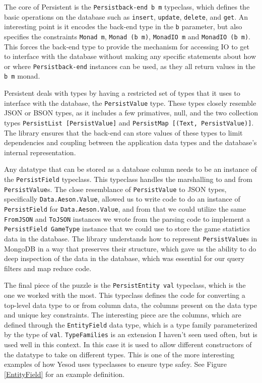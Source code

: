 \documentclass{chi2009}
\newcommand{\code}[1]{\texttt{#1}}
\begin{document}
The core of Persistent is the \code{Persistback-end b m} typeclass, which defines the basic operations on the database such as \code{insert}, \code{update}, \code{delete}, and \code{get}.  An interesting point is it encodes the back-end type in the \code{b} parameter, but also specifies the constraints \code{Monad m}, \code{Monad (b m)}, \code{MonadIO m} and \code{MonadIO (b m)}.  This forces the back-end type to provide the mechanism for accessing IO to get to interface with the database without making any specific statements about how or where \code{Persistback-end} instances can be used, as they all return values in the \code{b m} monad.

Persistent deals with types by having a restricted set of types that it uses to interface with the database, the \code{PersistValue} type.  These types closely resemble JSON or BSON types, as it includes a few primatives, null, and the two collection types \code{PersistList [PersistValue]} and \code{PersistMap [(Text, PersistValue)]}.  The library ensures that the back-end can store values of these types to limit dependencies and coupling between the application data types and the database's internal representation.

Any datatype that can be stored as a database column needs to be an instance of the \code{PersistField} typeclass.  This typeclass handles the marshalling to and from \code{PersistValue}s.  The close resemblance of \code{PersistValue} to JSON types, specifically \code{Data.Aeson.Value}, allowed us to write code to do an instance of \code{PersistField} for \code{Data.Aeson.Value}, and from that we could utilize the same \code{FromJSON} and \code{ToJSON} instances we wrote from the parsing code to implement a \code{PersistField GameType} instance that we could use to store the game statistics data in the database.  The library understands how to represent \code{PersistValue}s in MongoDB in a way that preserves their structure, which gave us the ability to do deep inspection of the data in the database, which was essential for our query filters and map reduce code.

The final piece of the puzzle is the \code{PersistEntity val} typeclass, which is the one we worked with the most.  This typeclass defines the code for converting a top-level data type to or from column data, the columns present on the data type and unique key constraints.  The interesting piece are the columns, which are defined through the \code{EntityField} data type, which is a type family parameterized by the type of \code{val}.  \code{TypeFamilies} is an extension I haven't seen used often, but is used well in this context.  In this case it is used to allow different constructors of the datatype to take on different types.  This is one of the more interesting examples of how Yesod uses typeclasses to ensure type safey.  See Figure \ref{EntityField} for an example definition.
\end{document}
